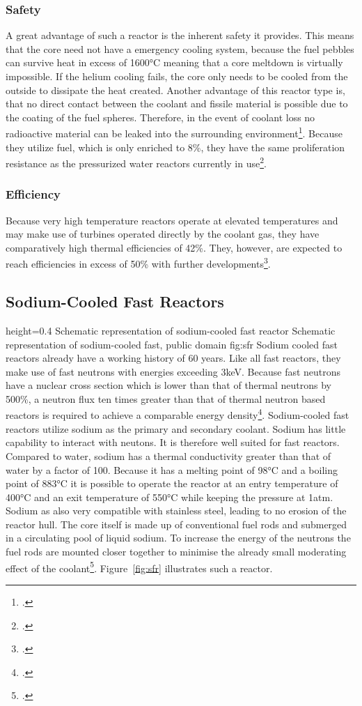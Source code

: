 \subsubsection{Safety}
A great advantage of such a reactor is the inherent safety it provides. This means that the core
need not have a emergency cooling system, because the fuel pebbles can survive heat in excess of 1600°C
meaning that a core meltdown is virtually impossible. If the helium cooling fails, the core only needs to
be cooled from the outside to dissipate the heat created. Another advantage of this reactor type is, that
no direct contact between the coolant and fissile material is possible due to the coating of the fuel
spheres. Therefore, in the event of coolant loss no radioactive material can be leaked
into the surrounding environment\footcite[18-21]{VHTRTS}.
Because they utilize fuel, which is only enriched to 8\%, they have the same proliferation resistance
as the pressurized water reactors currently in use\footcite{VHTRTS}.
\subsubsection{Efficiency}
Because very high temperature reactors operate at elevated temperatures and may make use of turbines
operated directly by the coolant gas, they have comparatively high thermal efficiencies of 42\%.
They, however, are expected to reach efficiencies in excess of 50\% with further developments\footcite[62]{T4Gen}.
\pagebreak
\subsection{Sodium-Cooled Fast Reactors}\label{chap:sfr}
    {height=0.4\textheight}
    {Schematic representation of sodium-cooled fast reactor}
    {Schematic representation of sodium-cooled fast, public domain}
    {fig:sfr}
Sodium cooled fast reactors already have a working history of 60 years. Like all fast reactors, they make
use of fast neutrons with energies exceeding 3keV. Because fast neutrons have a nuclear cross section which is lower than that
of thermal neutrons by 500\%, a neutron flux ten times greater than that of thermal neutron based reactors
is required to achieve a comparable energy density\footcite[120-122]{ReactorPhysics}.
Sodium-cooled fast reactors utilize sodium as the primary and secondary coolant. Sodium has little
capability to interact with neutons. It is therefore well suited for fast reactors. Compared
to water, sodium has a thermal conductivity greater than that of water by a factor of 100. Because
it has a melting point of 98°C and a boiling point of 883°C it is possible to operate the reactor at an
entry temperature of 400°C and an exit temperature of 550°C while keeping the pressure at 1atm. Sodium
as also very compatible with stainless steel, leading to no erosion of the reactor hull. The core
itself is made up of conventional fuel rods and submerged in a circulating pool of liquid sodium.
To increase the energy of the neutrons the fuel rods are mounted closer together to minimise the
already small moderating effect of the coolant\footcite[94-110]{T4Gen}. Figure~\ref{fig:sfr} illustrates
such a reactor.
